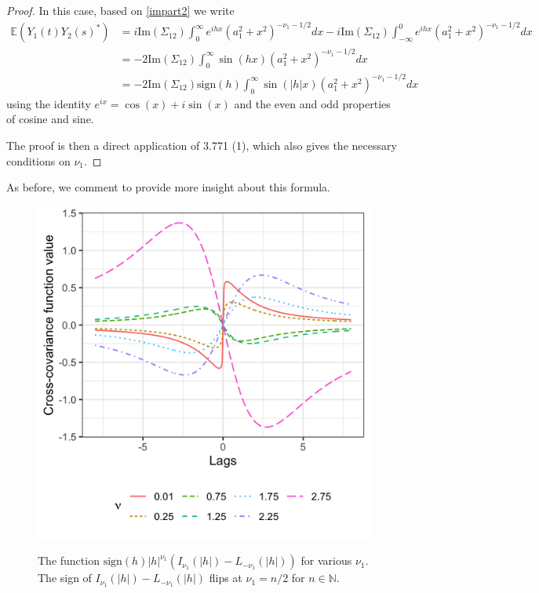 \documentclass[11pt]{article}
\begin{document}
\begin{proof}
In this case, based on \eqref{impart2} we write \begin{align*}
\mathbb{E}\left(Y_1(t) Y_2(s)^*\right)
&=i\textrm{Im}(\Sigma_{12})\int_0^\infty e^{ihx}(a_1^2 + x^2)^{-\nu_1 - 1/2} dx  -i\textrm{Im}(\Sigma_{12})\int_{-\infty}^0 e^{ihx}(a_1^2 + x^2)^{-\nu_1 - 1/2} dx \\
&=-2\textrm{Im}(\Sigma_{12})\int_0^\infty \sin(hx)(a_1^2 + x^2)^{-\nu_1 - 1/2}dx\\
&=-2\textrm{Im}(\Sigma_{12})\textrm{sign}(h)\int_0^\infty \sin(|h|x)(a_1^2 + x^2)^{-\nu_1 - 1/2}dx\end{align*}using the identity $e^{ix} = \cos(x) + i\sin(x)$ and the even and odd properties of cosine and sine.


The proof is then a direct application of \cite{noauthor_table_2015} 3.771 (1), which also gives the necessary conditions on $\nu_1$.
\end{proof}

As before, we comment to provide more insight about this formula.

\begin{figure}
\centering
\includegraphics[scale = .15]{../example_fun.png}\label{fig:re_ent}
\caption{The function $\textrm{sign}(h)|h|^{\nu_1} \left(I_{\nu_1}(|h|) - L_{-\nu_1}(|h|)\right)$ for various $\nu_1$. The sign of $I_{\nu_1}(|h|) - L_{-\nu_1}(|h|)$ flips at $\nu_1 = n/2$ for $ n\in \mathbb{N}$.}
\end{figure}
\end{document}
